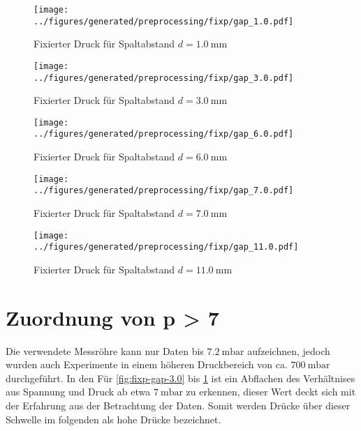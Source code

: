 \begin{figure}[htbp]
    \centering
    \begin{minipage}[t]{0.3\textwidth}
        \centering
        \texttt{[image: ../figures/generated/preprocessing/fixp/gap\_1.0.pdf]}
        \caption{Fixierter Druck für Spaltabstand \(d = \SI{1.0}{\milli\meter}\)}
        \label{fig:fixp-gap-1.0}
    \end{minipage}\hfill
    \begin{minipage}[t]{0.3\textwidth}
        \centering
        \texttt{[image: ../figures/generated/preprocessing/fixp/gap\_3.0.pdf]}
        \caption{Fixierter Druck für Spaltabstand \(d = \SI{3.0}{\milli\meter}\)}
        \label{fig:fixp-gap-3.0}
    \end{minipage}\hfill
    \begin{minipage}[t]{0.3\textwidth}
        \centering
        \texttt{[image: ../figures/generated/preprocessing/fixp/gap\_6.0.pdf]}
        \caption{Fixierter Druck für Spaltabstand \(d = \SI{6.0}{\milli\meter}\)}
        \label{fig:fixp-gap-6.0}
    \end{minipage}

    \vspace{0.5em} %

    \begin{minipage}[t]{0.45\textwidth}
        \centering
        \texttt{[image: ../figures/generated/preprocessing/fixp/gap\_7.0.pdf]}
        \caption{Fixierter Druck für Spaltabstand \(d = \SI{7.0}{\milli\meter}\)}
        \label{fig:fixp-gap-7.0}
    \end{minipage}\hfill
    \begin{minipage}[t]{0.45\textwidth}
        \centering
        \texttt{[image: ../figures/generated/preprocessing/fixp/gap\_11.0.pdf]}
        \caption{Fixierter Druck für Spaltabstand \(d = \SI{11.0}{\milli\meter}\)}
        \label{fig:fixp-gap-11.0}
    \end{minipage}
\end{figure}


\section{Zuordnung von p > 7}
\label{sec:pressurelarge}
Die verwendete Messröhre kann nur Daten bis \(\SI{7,2}{\milli\bar}\) aufzeichnen, jedoch wurden auch Experimente in einem höheren Druckbereich von ca. \(\SI{700}{\milli\bar}\) durchgeführt. In den Für \ref{fig:fixp-gap-3.0} bis \ref{fig:fixp-gap-11.0} ist ein Abflachen des Verhältnises aus Spannung und Druck ab etwa \(\SI{7}{\milli\bar}\) zu erkennen, dieser Wert deckt sich mit der Erfahrung aus der Betrachtung der Daten. Somit werden Drücke über dieser Schwelle im folgenden als hohe Drücke bezeichnet.




